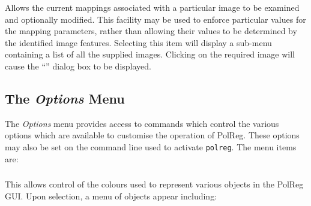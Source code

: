 \subsubsection {} Allows the current
mappings associated with a particular image to be examined and optionally
modified. This facility may be used to enforce particular values for the
mapping parameters, rather than allowing their values to be determined by
the identified image features. Selecting this item will display a sub-menu containing a list of all the supplied
images. Clicking on the required image will cause the ``'' dialog box to be displayed.

\subsection {The {\em Options} Menu}
The {\em Options} menu provides access to commands which control the
various options which are available to customise the operation of PolReg.
These options may also be set on the command line used to activate 
{\tt polreg}. The menu items are:

\subsubsection {} 
This allows control of the colours used to represent various objects in
the PolReg GUI. Upon selection, a menu of objects appear including:

